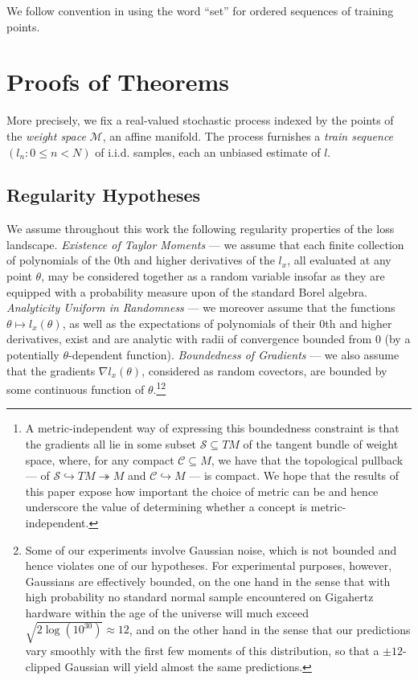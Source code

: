 \documentclass{article}
\theoremstyle{plain}
\theoremstyle{definition}
\newcommand{\Cc}{\mathcal{C}}   \newcommand{\CC}{\mathbb{C}}
\newcommand{\Mm}{\mathcal{M}}
\newcommand{\Ss}{\mathcal{S}}
\begin{document}
        We follow convention in using the word ``set'' for ordered sequences of
        training points. 

\section{Proofs of Theorems} \label{sect:proofs}
   
        More precisely, we fix a real-valued stochastic process indexed by the
        points of the \emph{weight space} $\Mm$, an affine manifold.  The
        process furnishes a \emph{train sequence} $(l_n: 0\leq n<N)$ of i.i.d.
        samples, each an unbiased estimate of $l$.


    \subsection{Regularity Hypotheses}
        We assume throughout this work the following regularity properties of
        the loss landscape.  \emph{Existence of Taylor Moments} --- we assume
        that each finite collection of polynomials of the $0$th and higher
        derivatives of the $l_x$, all evaluated at any point $\theta$, may be
        considered together as a random variable insofar as they are equipped
        with a probability measure upon of the standard Borel algebra.
        \emph{Analyticity Uniform in Randomness} --- we moreover assume that
        the functions $\theta \mapsto l_x(\theta)$, as well as the expectations
        of polynomials of their $0$th and higher derivatives, exist and are
        analytic with radii of convergence bounded from $0$ (by a potentially
        $\theta$-dependent function).
        \emph{Boundedness of Gradients} --- we also assume that the gradients
        $\nabla l_x(\theta)$, considered as random covectors, are bounded by
        some continuous function of $\theta$.\footnote{
            A metric-independent way of expressing this boundedness constraint
            is that the gradients all lie in some subset $\Ss \subseteq TM$ of
            the tangent bundle of weight space, where, for any compact $\Cc
            \subseteq M$, we have that the topological pullback --- of
            $\Ss \hookrightarrow TM \twoheadrightarrow M$
            and
            $\Cc \hookrightarrow M$ ---
            is compact.  We hope that the results of this paper expose how
            important the choice of metric can be and hence underscore the
            value of determining  whether a concept is metric-independent.
        }\footnote{
            Some of our experiments involve Gaussian noise, which is not
            bounded and hence violates one of our hypotheses.  For experimental
            purposes, however, Gaussians are effectively bounded, on the one
            hand in the sense that with high probability no standard normal
            sample encountered on Gigahertz hardware within the age of the
            universe will much exceed $\sqrt{2 \log(10^{30})} \approx 12$, and
            on the other hand in the sense that our predictions vary smoothly
            with the first few moments of this distribution, so that a $\pm
            12$-clipped Gaussian will yield almost the same predictions.
        }
\end{document}
